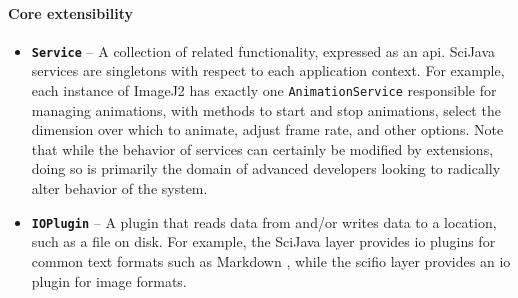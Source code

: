 \documentclass{bmcart}
\begin{document}
\paragraph*{Core extensibility}
\begin{itemize}
  \item \textbf{\texttt{Service}} -- A collection of related functionality,
    expressed as an \acrshort{api}. SciJava services are singletons with
    respect to each application context. For example, each instance of ImageJ2
    has exactly one \texttt{AnimationService} responsible for managing
    animations, with methods to start and stop animations, select the dimension
    over which to animate, adjust frame rate, and other options. Note that
    while the behavior of services can certainly be modified by extensions,
    doing so is primarily the domain of advanced developers looking to
    radically alter behavior of the system.
  \item \textbf{\texttt{IOPlugin}} -- A plugin that reads data from and/or
    writes data to a location, such as a file on disk. For example, the SciJava
    layer provides \acrshort{io} plugins for common text formats such as
    Markdown \cite{markdown}, while the \acrshort{scifio} layer provides an
    \acrshort{io} plugin for image formats.
\end{itemize}
\end{document}
